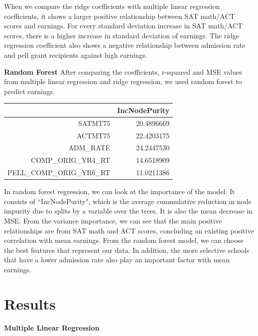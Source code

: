 \documentclass{article}
\begin{document}
  \indent When we compare the ridge coefficients with multiple linear regression coefficients, it shows a larger positive relationship between SAT math/ACT scores and earnings.  For every standard deviation increase in SAT math/ACT scores, there is a higher increase in standard deviation of earnings. The ridge regression coefficient also shows a negative relationship between admission rate and pell grant recipients against high earnings.
\newline

\noindent \textbf{Random Forest} \newline
\indent After comparing the coefficients, r-squared and MSE values from multiple linear regression and ridge regression, we used random forest to predict earnings. 

\begin{table}[ht]
\centering
\begin{tabular}{rr}
  \hline
 & IncNodePurity \\ 
  \hline
SATMT75 & 20.4896669 \\ 
  ACTMT75 & 22.4203175 \\ 
  ADM\_RATE & 24.2447530 \\ 
  COMP\_ORIG\_YR4\_RT & 14.6518909 \\ 
  PELL\_COMP\_ORIG\_YR6\_RT & 11.0211386 \\ 
   \hline
\end{tabular}
\end{table}\noindent In random forest regression, we can look at the importance of the model.   It consists of ``IncNodePurity", which is the average cummulative reduction in node impurity due to splits by a variable over the trees. It is also the mean decrease in MSE.   From the variance importance, we can see that the main positive relationships are from SAT math and ACT scores, concluding an existing positive correlation with mean earnings.   From the random forest model, we can choose the best features that represent our data.  In addition, the more selective schools that have a lower admission rate also play an important factor with mean earnings. 

\clearpage
\section{Results}

\noindent \textbf{Multiple Linear Regression}\newline
\end{document}
